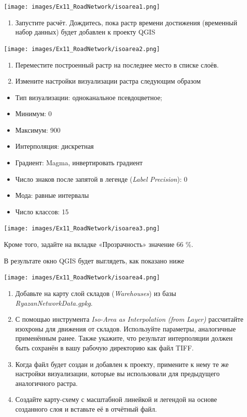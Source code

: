 \documentclass[
  12pt,
]{book}
\providecommand{\tightlist}{%
  \setlength{\itemsep}{0pt}\setlength{\parskip}{0pt}}
\begin{document}
\texttt{[image: images/Ex11\_RoadNetwork/isoarea1.png]}

\begin{enumerate}
\def\labelenumi{\arabic{enumi}.}
\setcounter{enumi}{5}
\tightlist
\item
  Запустите расчёт. Дождитесь, пока растр времени достижения (временный набор данных) будет добавлен к проекту QGIS
\end{enumerate}

\texttt{[image: images/Ex11\_RoadNetwork/isoarea2.png]}

\begin{enumerate}
\def\labelenumi{\arabic{enumi}.}
\setcounter{enumi}{6}
\item
  Переместите построенный растр на последнее место в списке слоёв.
\item
  Измените настройки визуализации растра следующим образом
\end{enumerate}

\begin{itemize}
\tightlist
\item
  Тип визуализации: одноканальное псевдоцветное;
\item
  Минимум: 0
\item
  Максимум: 900
\item
  Интерполяция: дискретная
\item
  Градиент: Magma, инвертировать градиент
\item
  Число знаков после запятой в легенде (\emph{Label Precision}): 0
\item
  Мода: равные интервалы
\item
  Число классов: 15
\end{itemize}

\texttt{[image: images/Ex11\_RoadNetwork/isoarea3.png]}

Кроме того, задайте на вкладке «Прозрачность» значение 66 \%.

В результате окно QGIS будет выглядеть, как показано ниже

\texttt{[image: images/Ex11\_RoadNetwork/isoarea4.png]}

\begin{enumerate}
\def\labelenumi{\arabic{enumi}.}
\setcounter{enumi}{8}
\item
  Добавьте на карту слой складов (\emph{Warehouses}) из базы \emph{RyazanNetworkData.gpkg}.
\item
  С помощью инструмента \emph{Iso-Area as Interpolation (from Layer)} рассчитайте изохроны для движения от складов. Используйте параметры, аналогичные применённым ранее. Также укажите, что результат интерполяции должен быть сохранён в вашу рабочую директорию как файл TIFF.
\item
  Когда файл будет создан и добавлен к проекту, примените к нему те же настройки визуализации, которые вы использовали для предыдущего аналогичного растра.
\item
  Создайте карту-схему с масштабной линейкой и легендой на основе созданного слоя и вставьте её в отчётный файл.
\end{enumerate}
\end{document}
